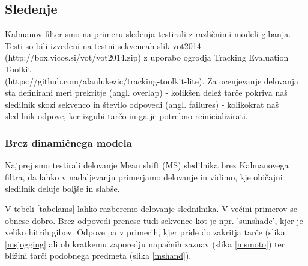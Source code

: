 \documentclass[a4paper]{article}
\begin{document}
\subsection{Sledenje}
Kalmanov filter smo na primeru sledenja testirali z različnimi modeli gibanja. Testi so bili izvedeni na testni sekvencah slik vot2014 (http://box.vicos.si/vot/vot2014.zip) z uporabo ogrodja Tracking Evaluation Toolkit \\ (https://github.com/alanlukezic/tracking-toolkit-lite). Za ocenjevanje delovanja sta definirani meri prekritje (angl. overlap) - kolikšen delež tarče pokriva naš sledilnik skozi sekvenco in število odpovedi (angl. failures) - kolikokrat naš sledilnik odpove, ker izgubi tarčo in ga je potrebno reinicializirati. 

\subsubsection{Brez dinamičnega modela}
Najprej smo testirali delovanje Mean shift (MS) sledilnika brez Kalmanovega filtra, da lahko v nadaljevanju primerjamo delovanje in vidimo, kje običajni sledilnik deluje boljše in slabše. 

V tebeli \ref{tabelams} lahko razberemo delovanje slednilnika. V večini primerov se obnese dobro. Brez odpovedi prenese tudi sekvence kot je npr. 'sunshade', kjer je veliko hitrih gibov. Odpove pa v primerih, kjer pride do zakritja tarče (slika \ref{msjogging} ali ob kratkemu zaporedju napačnih zaznav (slika \ref{msmoto}) ter bližini tarči podobnega predmeta (slika \ref{mshand}).
\end{document}
